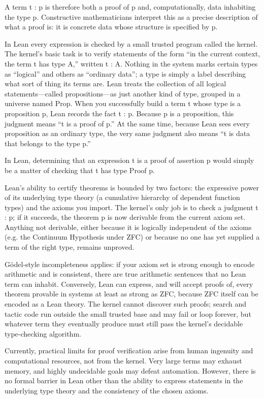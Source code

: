 \documentclass{article}
\begin{document}
A term t : p is therefore both a proof of p and, computationally, data inhabiting the type p. Constructive mathematicians interpret this as a precise description of what a proof is: it is concrete data whose structure is specified by p. 

In Lean every expression is checked by a small trusted program called the kernel. The kernel’s basic task is to verify statements of the form “in the current context, the term t has type A,” written t : A. Nothing in the system marks certain types as “logical” and others as “ordinary data”; a type is simply a label describing what sort of thing its terms are. Lean treats the collection of all logical statements—called propositions—as just another kind of type, grouped in a universe named Prop. When you successfully build a term t whose type is a proposition p, Lean records the fact t : p. Because p is a proposition, this judgment means “t is a proof of p.” At the same time, because Lean sees every proposition as an ordinary type, the very same judgment also means “t is data that belongs to the type p.” 

In Lean, determining that an expression t is a proof of assertion p would simply be a matter of checking that t has type Proof p. 

Lean’s ability to certify theorems is bounded by two factors:  the expressive power of its underlying type theory (a cumulative hierarchy of dependent function types) and the axioms you import. The kernel’s only job is to check a judgment t : p; if it succeeds, the theorem p is now derivable from the current axiom set. Anything not derivable, either because it is logically independent of the axioms (e.g. the Continuum Hypothesis under ZFC) or because no one has yet supplied a term of the right type, remains unproved. 

Gödel‑style incompleteness applies: if your axiom set is strong enough to encode arithmetic and is consistent, there are true arithmetic sentences that no Lean term can inhabit. Conversely, Lean can express, and will accept proofs of, every theorem provable in systems at least as strong as ZFC, because ZFC itself can be encoded as a Lean theory. The kernel cannot discover such proofs; search and tactic code run outside the small trusted base and may fail or loop forever, but whatever term they eventually produce must still pass the kernel’s decidable type‑checking algorithm. 

Currently, practical limits for proof verification arise from human ingenuity and computational resources, not from the kernel. Very large terms may exhaust memory, and highly undecidable goals may defeat automation. However, there is no formal barrier in Lean other than the ability to express statements in the underlying type theory and the consistency of the chosen axioms.
\end{document}
